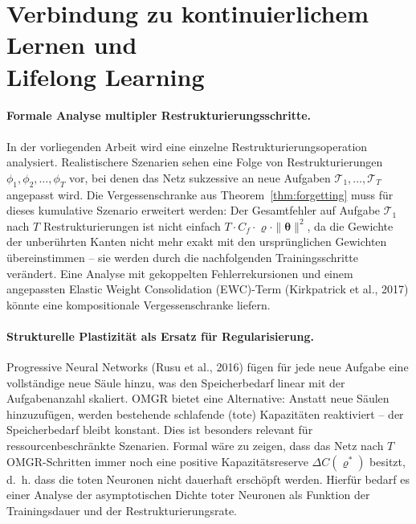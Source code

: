 ﻿\documentclass[12pt, a4paper, openany]{report}
\begin{document}
\section{Verbindung zu kontinuierlichem Lernen und \\ Lifelong Learning}
\label{sec:outlook_continual}

\paragraph{Formale Analyse multipler Restrukturierungsschritte.}
In der vorliegenden Arbeit wird eine einzelne Restrukturierungsoperation
analysiert.  Realistischere Szenarien sehen eine Folge von
Restrukturierungen $\phi_1, \phi_2, \ldots, \phi_T$ vor, bei denen
das Netz sukzessive an neue Aufgaben $\mathcal{T}_1, \ldots, \mathcal{T}_T$
angepasst wird.  Die Vergessenschranke aus Theorem~\ref{thm:forgetting}
muss für dieses kumulative Szenario erweitert werden: Der Gesamtfehler
auf Aufgabe $\mathcal{T}_1$ nach $T$ Restrukturierungen ist nicht
einfach $T \cdot C_f \cdot \varrho \cdot \|\bm{\theta}\|^2$, da die
Gewichte der unberührten Kanten nicht mehr exakt mit den ursprünglichen
Gewichten übereinstimmen -- sie werden durch die nachfolgenden
Trainingsschritte verändert.  Eine Analyse mit gekoppelten
Fehlerrekursionen und einem angepassten Elastic Weight Consolidation
(EWC)-Term (Kirkpatrick et al., 2017) könnte eine kompositionale
Vergessenschranke liefern.

\paragraph{Strukturelle Plastizität als Ersatz für Regularisierung.}
Progressive Neural Networks (Rusu et al., 2016) fügen für jede neue
Aufgabe eine vollständige neue Säule hinzu, was den Speicherbedarf
linear mit der Aufgabenanzahl skaliert.  OMGR bietet eine Alternative:
Anstatt neue Säulen hinzuzufügen, werden bestehende schlafende
(tote) Kapazitäten reaktiviert -- der Speicherbedarf bleibt konstant.
Dies ist besonders relevant für ressourcenbeschränkte Szenarien.
Formal wäre zu zeigen, dass das Netz nach $T$ OMGR-Schritten immer noch
eine positive Kapazitätsreserve $\Delta C(\varrho^*)$ besitzt, d.~h.
dass die toten Neuronen nicht dauerhaft erschöpft werden.  Hierfür
bedarf es einer Analyse der asymptotischen Dichte toter Neuronen als
Funktion der Trainingsdauer und der Restrukturierungsrate.
\end{document}
